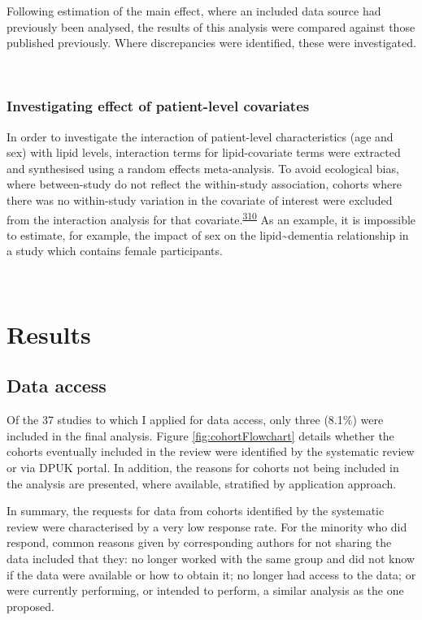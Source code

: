 \documentclass[a4paper, twoside]{templates/ociamthesis}
\begin{document}
Following estimation of the main effect, where an included data source had previously been analysed, the results of this analysis were compared against those published previously. Where discrepancies were identified, these were investigated.

~

\hypertarget{investigating-effect-of-patient-level-covariates}{%
\subsubsection{Investigating effect of patient-level covariates}\label{investigating-effect-of-patient-level-covariates}}

In order to investigate the interaction of patient-level characteristics (age and sex) with lipid levels, interaction terms for lipid-covariate terms were extracted and synthesised using a random effects meta-analysis. To avoid ecological bias, where between-study do not reflect the within-study association, cohorts where there was no within-study variation in the covariate of interest were excluded from the interaction analysis for that covariate.\textsuperscript{\protect\hyperlink{ref-burke2017}{310}} As an example, it is impossible to estimate, for example, the impact of sex on the lipid\textasciitilde dementia relationship in a study which contains female participants.

~

\hypertarget{results-2}{%
\section{Results}\label{results-2}}

\hypertarget{data-access}{%
\subsection{Data access}\label{data-access}}

Of the 37 studies to which I applied for data access, only three (8.1\%) were included in the final analysis. Figure \ref{fig:cohortFlowchart} details whether the cohorts eventually included in the review were identified by the systematic review or via DPUK portal. In addition, the reasons for cohorts not being included in the analysis are presented, where available, stratified by application approach.

In summary, the requests for data from cohorts identified by the systematic review were characterised by a very low response rate. For the minority who did respond, common reasons given by corresponding authors for not sharing the data included that they: no longer worked with the same group and did not know if the data were available or how to obtain it; no longer had access to the data; or were currently performing, or intended to perform, a similar analysis as the one proposed.
\end{document}
